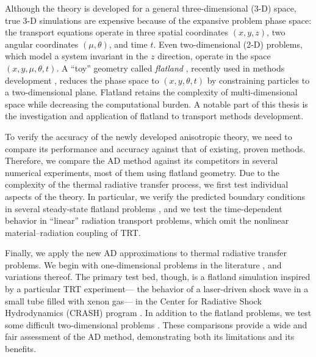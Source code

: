 Although the theory is developed for a general three-dimensional (3-D) space,
true 3-D simulations are expensive because of the expansive problem phase
space: the transport equations operate in three spatial coordinates $(x,y,z)$,
two angular coordinates $(\mu,\theta)$, and time $t$. Even two-dimensional (2-D)
problems, which model a system invariant in the $z$ direction, operate in the
space $(x,y,\mu,\theta,t)$. A ``toy'' geometry called \emph{flatland}
\cite{Abb1884}, recently used in methods development \cite{Asa2008,Lar2009c},
reduces the phase space to $(x,y,\theta,t)$ by constraining particles to a
two-dimensional plane. Flatland retains the complexity of multi-dimensional
space while decreasing the computational burden. A notable part of this thesis
is the investigation and application of flatland to transport methods
development.

To verify the accuracy of the newly developed anisotropic theory, we need to
compare its performance and accuracy against that of existing, proven methods.
Therefore, we compare the AD method against its competitors in several numerical
experiments, most of them using flatland geometry. Due to the complexity of
the thermal radiative transfer process, we first test individual aspects of the
theory. In particular, we verify the predicted boundary conditions in several
steady-state flatland problems \cite{Joh2011a}, and we test the time-dependent
behavior in ``linear'' radiation transport problems, which omit the nonlinear
material--radiation coupling of TRT.

Finally, we apply the new AD approximations to thermal radiative transfer
problems. We begin with
one-dimensional problems in the literature \cite{Rau2005}, and variations
thereof. The primary test bed, though, is a flatland simulation
\cite{Joh2011} inspired by a particular TRT experiment---%
the behavior of a laser-driven shock wave in a small tube filled with xenon
gas---%
in the Center for Radiative Shock Hydrodynamics (CRASH) program
\cite{Crash2010}. In addition to the flatland problems, we test some difficult
two-dimensional problems \cite{Mou2006}. These comparisons provide a wide and
fair assessment of the AD method, demonstrating both its limitations and its
benefits.


